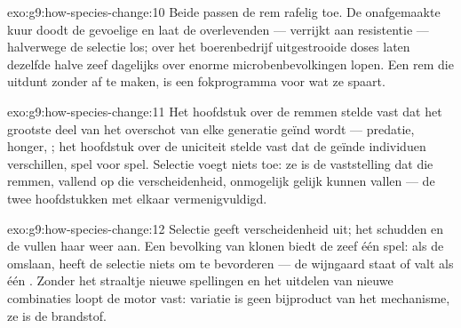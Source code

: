 \begin{solution}{exo:g9:how-species-change:10}
Beide passen de rem rafelig toe. De onafgemaakte kuur doodt de
gevoelige  en laat de overlevenden --- verrijkt aan
resistentie --- halverwege de selectie los; over het boerenbedrijf
uitgestrooide doses laten dezelfde halve zeef dagelijks over
enorme microbenbevolkingen lopen. Een rem die uitdunt zonder af te
maken, is een fokprogramma voor wat ze spaart.
\end{solution}

\begin{solution}{exo:g9:how-species-change:11}
Het hoofdstuk over de remmen stelde vast dat het grootste deel van
het overschot van elke generatie geïnd wordt --- predatie, honger,
; het hoofdstuk over de uniciteit stelde vast dat de
geïnde individuen  verschillen, spel voor spel. Selectie
voegt niets toe: ze is de vaststelling dat die remmen, vallend op
die verscheidenheid, onmogelijk gelijk kunnen vallen --- de twee
hoofdstukken met elkaar vermenigvuldigd.
\end{solution}

\begin{solution}{exo:g9:how-species-change:12}
Selectie geeft verscheidenheid uit; het schudden en de 
vullen haar weer aan. Een bevolking van klonen biedt de zeef één
spel: als de  omslaan, heeft de selectie niets om te
bevorderen --- de wijngaard staat of valt als één . Zonder het
straaltje nieuwe spellingen en het uitdelen van nieuwe combinaties
loopt de motor vast: variatie is geen bijproduct van het
mechanisme, ze is de brandstof.
\end{solution}

